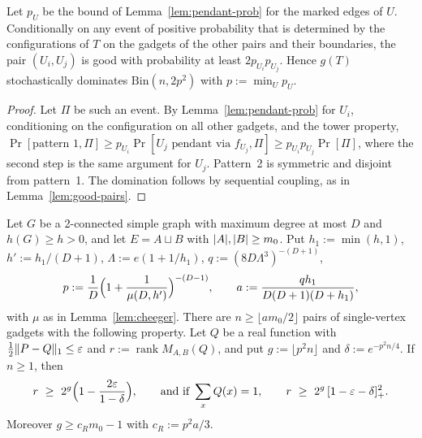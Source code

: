 \begin{lemma}\label{lem:pendant-pairs}
Let $p_U$ be the bound of Lemma~\ref{lem:pendant-prob} for the marked edges of $U$. Conditionally on any event of positive probability that is determined by the configurations of $T$ on the gadgets of the other pairs and their boundaries, the pair $(U_i,U_j)$ is good with probability at least $2p_{U_i}p_{U_j}$. Hence $g(T)$ stochastically dominates $\mathrm{Bin}(n,2p^2)$ with $p:=\min_Up_U$.
\end{lemma}

\begin{proof}
Let $\Pi$ be such an event. By Lemma~\ref{lem:pendant-prob} for $U_i$, conditioning on the configuration on all other gadgets, and the tower property, $\Pr[\text{pattern 1},\Pi]\ge p_{U_i}\Pr[U_j\text{ pendant via }f_{U_j},\Pi]\ge p_{U_i}p_{U_j}\Pr[\Pi]$, where the second step is the same argument for $U_j$. Pattern~2 is symmetric and disjoint from pattern~1. The domination follows by sequential coupling, as in Lemma~\ref{lem:good-pairs}.
\end{proof}

\begin{theorem}\label{thm:signed-expander}
Let $G$ be a 2-connected simple graph with maximum degree at most $D$ and $h(G)\ge h>0$, and let $E=A\sqcup B$ with $\lvert A\rvert,\lvert B\rvert\ge m_0$. Put $h_1:=\min(h,1)$, $h':=h_1/(D+1)$, $\Lambda:=e(1+1/h_1)$, $q:=(8D\Lambda^3)^{-(D+1)}$,
\[
  p:=\frac1D\Bigl(1+\frac1{\mu(D,h')}\Bigr)^{-(D-1)},\qquad a:=\frac{qh_1}{D(D+1)(D+h_1)},
\]
with $\mu$ as in Lemma~\ref{lem:cheeger}. There are $n\ge\lfloor am_0/2\rfloor$ pairs of single-vertex gadgets with the following property. Let $Q$ be a real function with $\frac12\lVert P-Q\rVert_1\le\varepsilon$ and $r:=\operatorname{rank}M_{A,B}(Q)$, and put $g:=\lfloor p^2n\rfloor$ and $\delta:=e^{-p^2n/4}$. If $n\ge1$, then
\[
  r\ \ge\ 2^g\Bigl(1-\frac{2\eps}{1-\delta}\Bigr),\qquad\text{and if }\sum_xQ(x)=1,\qquad r\ \ge\ 2^g\,[1-\eps-\delta]_+^2 .
\]
Moreover $g\ge c_Rm_0-1$ with $c_R:=p^2a/3$.
\end{theorem}


